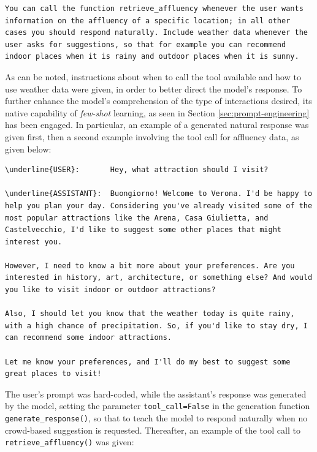 \begin{Verbatim}[breaklines=true]
You can call the function retrieve_affluency whenever the user wants information on the affluency of a specific location; in all other cases you should respond naturally. Include weather data whenever the user asks for suggestions, so that for example you can recommend indoor places when it is rainy and outdoor places when it is sunny.
\end{Verbatim}

As can be noted, instructions about when to call the tool available and how to use weather data were given, in order to better direct the model's response. To further enhance the model's comprehension of the type of interactions desired, its native capability of \textit{few-shot} learning, as seen in Section \ref{sec:prompt-engineering} has been engaged. In particular, an example of a generated natural response was given first, then a second example involving the tool call for affluency data, as given below:

\begin{Verbatim}[breaklines=true]
\underline{USER}:       Hey, what attraction should I visit?

\underline{ASSISTANT}:  Buongiorno! Welcome to Verona. I'd be happy to help you plan your day. Considering you've already visited some of the most popular attractions like the Arena, Casa Giulietta, and Castelvecchio, I'd like to suggest some other places that might interest you.

However, I need to know a bit more about your preferences. Are you interested in history, art, architecture, or something else? And would you like to visit indoor or outdoor attractions?

Also, I should let you know that the weather today is quite rainy, with a high chance of precipitation. So, if you'd like to stay dry, I can recommend some indoor attractions.

Let me know your preferences, and I'll do my best to suggest some great places to visit!
\end{Verbatim}

The user's prompt was hard-coded, while the assistant's response was generated by the model, setting the parameter \texttt{tool\_call=False} in the generation function \texttt{generate\_response()}, so that to teach the model to respond naturally when no crowd-based suggestion is requested. Thereafter, an example of the tool call to \texttt{retrieve\_affluency()} was given:

